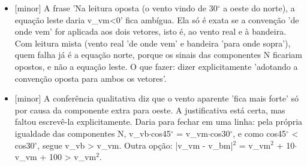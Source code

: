 \documentclass{article}%
\begin{document}
\begin{itemize}%
\item%
{[}minor{]} A frase 'Na leitura oposta (o vento vindo de 30$^\circ$ a oeste do norte), a equação leste daria v\_vm<0' fica ambígua. Ela só é exata se a convenção 'de onde vem' for aplicada aos dois vetores, isto é, ao vento real e à bandeira. Com leitura mista (vento real 'de onde vem' e bandeira 'para onde sopra'), quem falha já é a equação norte, porque os sinais das componentes N ficariam opostos, e não a equação leste. O que fazer: dizer explicitamente 'adotando a convenção oposta para ambos os vetores'.%
\item%
{[}minor{]} A conferência qualitativa diz que o vento aparente 'fica mais forte' só por causa da componente extra para oeste. A justificativa está certa, mas faltou escrevê{-}la explicitamente. Daria para fechar em uma linha: pela própria igualdade das componentes N, v\_vb$\cdot$cos45$^\circ$ = v\_vm$\cdot$cos30$^\circ$, e como cos45$^\circ$ < cos30$^\circ$, segue v\_vb > v\_vm. Outra opção: |v\_vm - v\_bm|$^2$ = v\_vm$^2$ + 10$\cdot$v\_vm + 100 > v\_vm$^2$.%
\end{itemize}%
\end{document}
